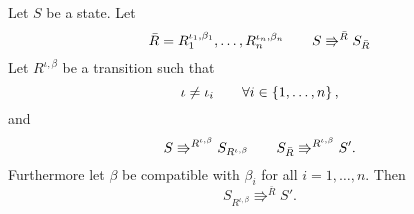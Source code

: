\begin{lemma} \label{lem:lemma2}
  Let $S$ be a state. Let
  \begin{equation*}
    \bar{R} = R_1^{\iota_1, \beta_1}, \dots, R_n^{\iota_n, \beta_n} \quad\quad
    S \Rrightarrow^{\bar{R}} S_{\bar{R}}
  \end{equation*}
  Let $R^{\iota, \beta}$ be a transition such that
  \begin{equation} \label{eq:lemma2_1}
    \iota \neq \iota_i \quad\quad \forall i \in \left\{ 1, \dots, n \right\},
  \end{equation}
  and
  \begin{equation*}
    S \Rrightarrow^{R^{\iota, \beta}} S_{R^{\iota, \beta}} \quad\quad
    S_{\bar{R}} \Rrightarrow^{R^{\iota, \beta}} S'.
  \end{equation*}
  Furthermore let $\beta$ be compatible with $\beta_i$ for all $i = 1, \dots,
  n$.
  Then
  \begin{equation*}
    S_{R^{\iota, \beta}} \Rrightarrow^{\bar{R}} S'.
  \end{equation*}
\end{lemma}

